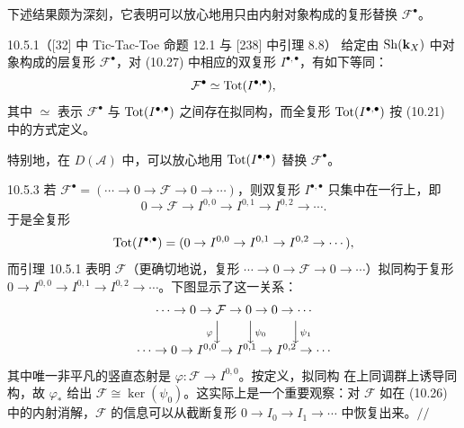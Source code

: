 下述结果颇为深刻，它表明可以放心地用只由内射对象构成的复形替换
$\mathcal F^{\bullet}$。

\begin{wlem}{10.5.1}（[32] 中 Tic-Tac-Toe 命题 12.1 与 [238] 中引理 8.8）
给定由 $\operatorname{Sh}(\mathbf{k}_X)$ 中对象构成的层复形
$\mathcal F^{\bullet}$，对 (10.27) 中相应的双复形
$I^{\bullet,\bullet}$，有如下等同：
\[
  \mathcal F^{\bullet}\simeq\operatorname{Tot}(I^{\bullet,\bullet}),
\]
其中 $\simeq$ 表示 $\mathcal F^{\bullet}$ 与
$\operatorname{Tot}(I^{\bullet,\bullet})$ 之间存在拟同构，而全复形
$\operatorname{Tot}(I^{\bullet,\bullet})$ 按 (10.21) 中的方式定义。

特别地，在 $D(\mathcal A)$ 中，可以放心地用
$\operatorname{Tot}(I^{\bullet,\bullet})$ 替换 $\mathcal F^{\bullet}$。
\end{wlem}


\begin{wexam}{10.5.3}
若 $\mathcal F^{\bullet}=(\cdots\to0\to\mathcal F\to0\to\cdots)$，则双复形
$I^{\bullet,\bullet}$ 只集中在一行上，即
\[
  0\to\mathcal F\to I^{0,0}\to I^{0,1}\to I^{0,2}\to\cdots .
\]
于是全复形
\[
  \operatorname{Tot}(I^{\bullet,\bullet})
  =(0\to I^{0,0}\to I^{0,1}\to I^{0,2}\to\cdots),
\]
而引理 10.5.1 表明 $\mathcal F$（更确切地说，复形
$\cdots\to0\to\mathcal F\to0\to\cdots$）拟同构于复形
$0\to I^{0,0}\to I^{0,1}\to I^{0,2}\to\cdots$。下图显示了这一关系：
\[
\begin{array}{c}
\cdots\to0\to\mathcal F\to0\to0\to\cdots\\[2pt]
\qquad\qquad{\scriptstyle\varphi}\Big\downarrow\qquad
\Big\downarrow{\scriptstyle\psi_0}\qquad
\Big\downarrow{\scriptstyle\psi_1}\\[2pt]
\cdots\to0\to I^{0,0}\to I^{0,1}\to I^{0,2}\to\cdots
\end{array}
\]
其中唯一非平凡的竖直态射是 $\varphi:\mathcal F\to I^{0,0}$。按定义，拟同构
在上同调群上诱导同构，故 $\varphi_*$ 给出
$\mathcal F\cong\ker(\psi_0)$。这实际上是一个重要观察：对 $\mathcal F$ 如在
(10.26) 中的内射消解，$\mathcal F$ 的信息可以从截断复形
$0\to I_0\to I_1\to\cdots$ 中恢复出来。\hfill$//$
\end{wexam}

